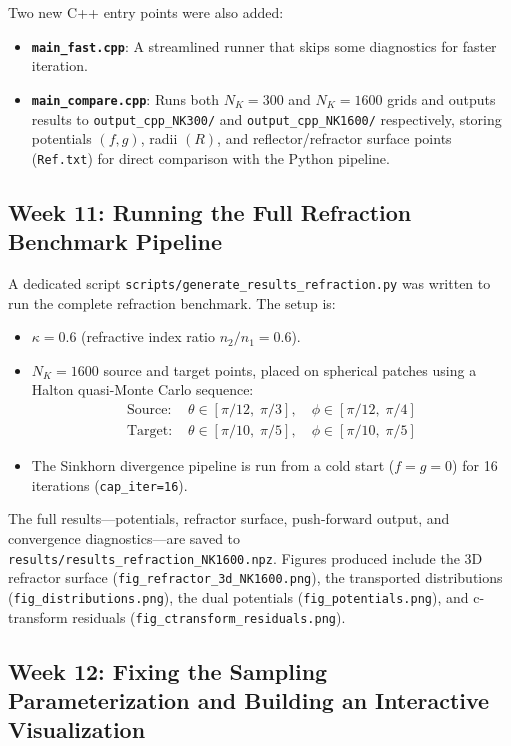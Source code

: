 \documentclass{article}
\begin{document}
Two new C++ entry points were also added:
\begin{itemize}
    \item \textbf{\texttt{main\_fast.cpp}}: A streamlined runner that skips some diagnostics for faster iteration.
    \item \textbf{\texttt{main\_compare.cpp}}: Runs both $N_K = 300$ and $N_K = 1600$ grids and outputs results to \texttt{output\_cpp\_NK300/} and \texttt{output\_cpp\_NK1600/} respectively, storing potentials $(f, g)$, radii $(R)$, and reflector/refractor surface points (\texttt{Ref.txt}) for direct comparison with the Python pipeline.
\end{itemize}

\subsection{Week 11: Running the Full Refraction Benchmark Pipeline}

A dedicated script \texttt{scripts/generate\_results\_refraction.py} was written to run the complete refraction benchmark. The setup is:
\begin{itemize}
    \item $\kappa = 0.6$ (refractive index ratio $n_2/n_1 = 0.6$).
    \item $N_K = 1600$ source and target points, placed on spherical patches using a Halton quasi-Monte Carlo sequence:
    \begin{align}
        \text{Source: } &\theta \in [\pi/12,\; \pi/3], \quad \phi \in [\pi/12,\; \pi/4] \\
        \text{Target: } &\theta \in [\pi/10,\; \pi/5], \quad \phi \in [\pi/10,\; \pi/5]
    \end{align}
    \item The Sinkhorn divergence pipeline is run from a cold start ($f = g = 0$) for 16 iterations (\texttt{cap\_iter=16}).
\end{itemize}
The full results---potentials, refractor surface, push-forward output, and convergence diagnostics---are saved to \texttt{results/results\_refraction\_NK1600.npz}. Figures produced include the 3D refractor surface (\texttt{fig\_refractor\_3d\_NK1600.png}), the transported distributions (\texttt{fig\_distributions.png}), the dual potentials (\texttt{fig\_potentials.png}), and c-transform residuals (\texttt{fig\_ctransform\_residuals.png}).

\subsection{Week 12: Fixing the Sampling Parameterization and Building an Interactive Visualization}
\end{document}
